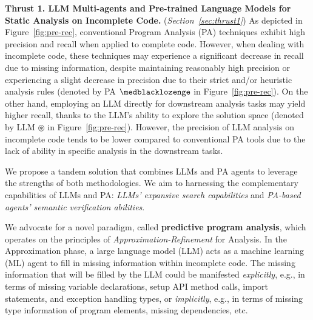 \noindent \textbf{Thrust 1. LLM Multi-agents and Pre-trained Language Models for Static Analysis on Incomplete Code.} ({\em Section~\ref{sec:thrust1}})
As depicted in Figure~\ref{fig:pre-rec}, conventional Program Analysis
(PA) techniques exhibit high precision and recall when applied to
complete code. However, when dealing with incomplete code, these
techniques may experience a significant decrease in recall due to
missing information, despite maintaining reasonably high precision or
experiencing a slight decrease in precision due to their strict and/or
heuristic analysis rules (denoted by PA $\medblacklozenge$ in
Figure~\ref{fig:pre-rec}). On the other hand, employing an LLM directly
for downstream analysis tasks may yield higher recall, thanks to the
LLM's ability to explore the solution space (denoted by LLM
$\circledast$ in Figure~\ref{fig:pre-rec}). However, the precision of
  LLM analysis on incomplete code tends to be lower compared to
  conventional PA tools due to the lack of ability in specific
  analysis in the downstream tasks.

We propose a tandem solution that combines LLMs and PA agents to
leverage the strengths of both methodologies. We aim to harnessing the
complementary capabilities of LLMs and PA: {\em LLMs' expansive search
  capabilities} and {\em PA-based agents' semantic verification
  abilities}.

We advocate for a novel paradigm, called {\bf predictive program
  analysis}, which operates on the principles of {\em
  Approximation-Refinement} for Analysis. In the Approximation phase,
a large language model (LLM) acts as a machine learning (ML) agent to
fill in missing information within incomplete code. The missing
information that will be filled by the LLM could be manifested {\em
  explicitly}, e.g., in terms of missing variable declarations, setup
API method calls, import statements, and exception handling types, or
{\em implicitly}, e.g., in terms of missing type information of 
program elements, missing dependencies, etc.




